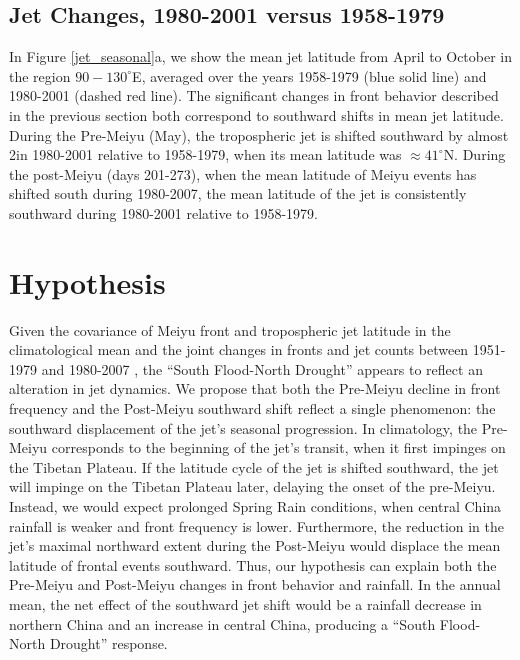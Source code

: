 \documentclass[draft,grl]{AGUTeX}
\begin{document}
\begin{article}
\subsection{Jet Changes, 1980-2001 versus 1958-1979}

	In Figure \ref{jet_seasonal}a, we show the mean jet latitude from April to October in the region $90-130^\circ$E, averaged over the years 1958-1979 (blue solid line) and 1980-2001 (dashed red line). The significant changes in front behavior described in the previous section both correspond to southward shifts in mean jet latitude. During the Pre-Meiyu (May), the tropospheric jet is shifted southward by almost 2\textdegree in 1980-2001 relative to 1958-1979, when its mean latitude was $\approx 41^\circ$N. During the post-Meiyu (days 201-273), when the mean latitude of Meiyu events has shifted south during 1980-2007, the mean latitude of the jet is consistently southward during 1980-2001 relative to 1958-1979.
	
	
\section{Hypothesis}

	Given the covariance of Meiyu front and tropospheric jet latitude in the climatological mean and the joint changes in fronts and jet counts between 1951-1979 and 1980-2007 , the ``South Flood-North Drought'' appears to reflect an alteration in jet dynamics. We propose that both the Pre-Meiyu decline in front frequency and the Post-Meiyu southward shift reflect a single phenomenon: the southward displacement of the jet's seasonal progression. In climatology, the Pre-Meiyu corresponds to the beginning of the jet's transit, when it first impinges on the Tibetan Plateau. If the latitude cycle of the jet is shifted southward, the jet will impinge on the Tibetan Plateau later, delaying the onset of the pre-Meiyu. Instead, we would expect prolonged Spring Rain conditions, when central China rainfall is weaker and front frequency is lower. Furthermore, the reduction in the jet's maximal northward extent during the Post-Meiyu would displace the mean latitude of frontal events southward.  Thus, our hypothesis can explain both the Pre-Meiyu and Post-Meiyu changes in front behavior and rainfall. In the annual mean, the net effect of the southward jet shift would be a rainfall decrease in northern China and an increase in central China, producing a ``South Flood-North Drought'' response.
	

\end{article}
\end{document}
